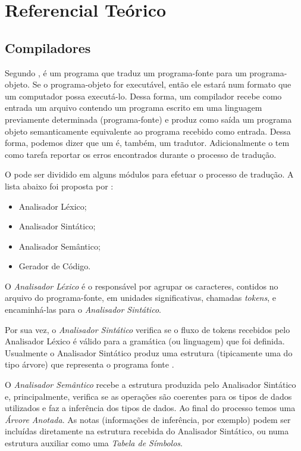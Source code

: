 \section{Referencial Teórico}
\subsection{Compiladores}
Segundo , \compilador{} é um programa que traduz um
programa-fonte para um programa-objeto. Se o programa-objeto for executável,
então ele estará num formato que um computador possa executá-lo. Dessa forma, um compilador recebe
como entrada um arquivo contendo um programa escrito em uma linguagem previamente
determinada (programa-fonte) e produz como saída um programa objeto semanticamente equivalente
ao programa recebido como entrada. Dessa forma, podemos dizer que um \compilador é,
também, um tradutor. Adicionalmente o \compilador tem como tarefa reportar os
erros encontrados durante o processo de tradução.

O \compilador pode ser dividido em alguns módulos para efetuar o processo de
tradução. A lista abaixo foi proposta por :

\begin{itemize}
	\item Analisador Léxico;
	\item Analisador Sintático;
	\item Analisador Semântico;
	\item Gerador de Código.
\end{itemize}

O \emph{Analisador Léxico} é o responsável por agrupar os caracteres, contidos
no arquivo do programa-fonte, em unidades significativas, chamadas
\emph{tokens}, e encaminhá-las para o \emph{Analisador Sintático}.

Por sua vez, o \emph{Analisador Sintático} verifica se o fluxo de tokens
recebidos pelo Analisador Léxico é válido para a gramática (ou linguagem) que
foi definida. Usualmente o Analisador Sintático produz uma estrutura
(tipicamente uma do tipo árvore) que representa o programa fonte
\cite{new-dragon-pt}.

O \emph{Analisador Semântico} recebe a estrutura produzida pelo Analisador
Sintático e, principalmente, verifica se as operações são coerentes para os
tipos de dados utilizados e faz a inferência dos tipos de dados. Ao final do
processo temos uma \emph{Árvore Anotada}. As notas (informações de inferência,
por exemplo) podem ser incluídas diretamente na estrutura recebida do
Analisador Sintático, ou numa estrutura auxiliar como uma \emph{Tabela de
Símbolos}.

